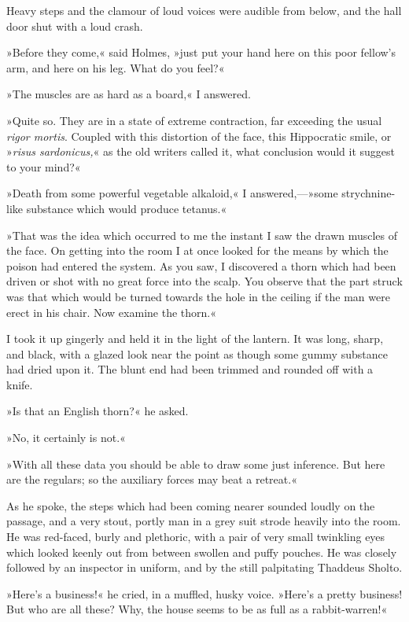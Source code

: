 Heavy steps and the clamour of loud voices were audible from below, and the hall door shut with a loud crash.

»Before they come,« said Holmes, »just put your hand here on this poor fellow's arm, and here on his leg. What do you feel?«

»The muscles are as hard as a board,« I answered.

»Quite so. They are in a state of extreme contraction, far exceeding the usual \textit{rigor mortis}. Coupled with this distortion of the face, this Hippocratic smile, or »\textit{risus sardonicus,}« as the old writers called it, what conclusion would it suggest to your mind?«

»Death from some powerful vegetable alkaloid,« I answered,—»some strychnine-like substance which would produce tetanus.«

»That was the idea which occurred to me the instant I saw the drawn muscles of the face. On getting into the room I at once looked for the means by which the poison had entered the system. As you saw, I discovered a thorn which had been driven or shot with no great force into the scalp. You observe that the part struck was that which would be turned towards the hole in the ceiling if the man were erect in his chair. Now examine the thorn.«

I took it up gingerly and held it in the light of the lantern. It was long, sharp, and black, with a glazed look near the point as though some gummy substance had dried upon it. The blunt end had been trimmed and rounded off with a knife.

»Is that an English thorn?« he asked.

»No, it certainly is not.«

»With all these data you should be able to draw some just inference. But here are the regulars; so the auxiliary forces may beat a retreat.«

As he spoke, the steps which had been coming nearer sounded loudly on the passage, and a very stout, portly man in a grey suit strode heavily into the room. He was red-faced, burly and plethoric, with a pair of very small twinkling eyes which looked keenly out from between swollen and puffy pouches. He was closely followed by an inspector in uniform, and by the still palpitating Thaddeus Sholto.

»Here's a business!« he cried, in a muffled, husky voice. »Here's a pretty business! But who are all these? Why, the house seems to be as full as a rabbit-warren!«

